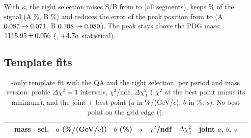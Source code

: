 With $\kappa$, the tight selection raises S/B from \PerAllKapLpQaSB{} to \PerAllKapLpTiSB{} (all segments), keeps \PerAllKapLpKeep\%
of the signal (A \PerAKapLpKeep\%, B \PerBKapLpKeep\%) and reduces the error of the peak position from \PerAllKapLpQaMe{} to
\PerAllKapLpTiMe\mevcc{} (A $0.087\to0.071$, B $0.108\to0.080$). The peak stays above the
PDG mass: $1115.95\pm0.056$\mevcc{} (\PerAllKapLpTiAbove\mevcc, $+4.7\sigma$ statistical).

\subsection{Template fits}

\begin{table}[H]
\centering\footnotesize
\caption{\La-only template fit with the QA and the tight \La{} selection, per period and mass version: profile $\Delta\chi^2=1$
intervals, $\chi^2$/ndf, $\Delta\chi^2_\Lambda$ (\La{} $\chi^2$ at the \Ks{} best point minus its minimum), and the joint
\Ks+\La{} best point ($a$ in \%/(GeV/$c$), $b$ in \%, $s$). No best point on the grid edge (\ChkEdgeTight).}
\label{tab:tightfits}
\setlength{\tabcolsep}{3.5pt}
\begin{tabular}{lllccccccc}
\toprule
 & mass & \La{} sel. & $a$ (\%/(GeV/$c$)) & $b$ (\%) & $s$ & $\chi^2$/ndf & $\Delta\chi^2_\Lambda$ & joint $a$, $b$, $s$ \\
\midrule

\bottomrule
\end{tabular}
\end{table}

